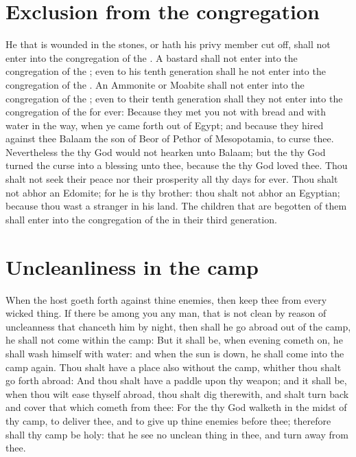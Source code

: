 \section*{Exclusion from the congregation}
\begin{biblechapter} %
\verse He that is wounded in the stones, or hath his privy member cut off, shall not enter into the congregation of the \LORD.
\verse A bastard shall not enter into the congregation of the \LORD; even to his tenth generation shall he not enter into the congregation of the \LORD.
\verse An Ammonite or Moabite shall not enter into the congregation of the \LORD; even to their tenth generation shall they not enter into the congregation of the \LORD for ever:
\verse Because they met you not with bread and with water in the way, when ye came forth out of Egypt; and because they hired against thee Balaam the son of Beor of Pethor of Mesopotamia, to curse thee.
\verse Nevertheless the \LORD thy God would not hearken unto Balaam; but the \LORD thy God turned the curse into a blessing unto thee, because the \LORD thy God loved thee.
\verse Thou shalt not seek their peace nor their prosperity all thy days for ever.
\verse Thou shalt not abhor an Edomite; for he is thy brother: thou shalt not abhor an Egyptian; because thou wast a stranger in his land.
\verse The children that are begotten of them shall enter into the congregation of the \LORD in their third generation.
\section*{Uncleanliness in the camp}
\verse When the host goeth forth against thine enemies, then keep thee from every wicked thing.
\verse If there be among you any man, that is not clean by reason of uncleanness that chanceth him by night, then shall he go abroad out of the camp, he shall not come within the camp:
\verse But it shall be, when evening cometh on, he shall wash himself with water: and when the sun is down, he shall come into the camp again.
\verse Thou shalt have a place also without the camp, whither thou shalt go forth abroad:
\verse And thou shalt have a paddle upon thy weapon; and it shall be, when thou wilt ease thyself abroad, thou shalt dig therewith, and shalt turn back and cover that which cometh from thee:
\verse For the \LORD thy God walketh in the midst of thy camp, to deliver thee, and to give up thine enemies before thee; therefore shall thy camp be holy: that he see no unclean thing in thee, and turn away from thee.

\end{biblechapter}
